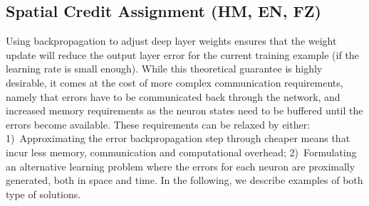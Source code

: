 \documentclass[journal,onecolumn,11pt]{IEEEtran}
\begin{document}

\subsection{Spatial Credit Assignment (HM, EN, FZ)}\label{sec:spatial_CA}
Using backpropagation to adjust deep layer weights ensures that the weight update  will reduce the output layer error for the current training example (if the learning rate is small enough).
While this theoretical guarantee is highly desirable, it comes at the cost of more complex communication requirements, namely that errors have to be communicated back through the network, and increased memory requirements as the neuron states need to be buffered until the errors become available.
These requirements can be relaxed by either:
1)~Approximating the error backpropagation step through cheaper means that incur less memory, communication and computational overhead;
2)~Formulating an alternative learning problem where the errors for each neuron are proximally generated, both in space and time.
In the following, we describe examples of both type of solutions.
\end{document}
